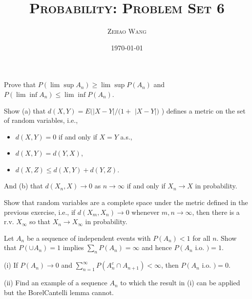 \documentclass[en, normal, 11pt, black]{elegantnote}
\title{\textsc{Probability: Problem Set 6}}
\author{\textsc{Zehao Wang}}
\date{\today}
\newenvironment{exercise}[1]{\begin{tcolorbox}[colback=black!15, colframe=black!80, breakable, title=#1]}{\end{tcolorbox}}
\begin{document}
    \maketitle
    \begin{exercise}{2.3.1}
        Prove that $P(\lim \sup A_n) \geqslant \lim \sup P(A_n)$ and $P(\lim \inf A_n) \leqslant \lim \inf P(A_n)$. 
    \end{exercise}

    \begin{exercise}{2.3.6. Metric for convergence in probability. }
        Show (a) that $d(X, Y)=E(|X-Y| /(1+$ $|X-Y|)$ ) defines a metric on the set of random variables, i.e., 
        \begin{itemize}
            \item[(i)] $d(X, Y)=0$ if and only if $X=Y$ a.s., 
            \item[(ii)] $d(X, Y)=d(Y, X)$, 
            \item[(iii)] $d(X, Z) \leq d(X, Y)+d(Y, Z)$. 
        \end{itemize}
        And (b) that $d\left(X_{n}, X\right) \rightarrow 0$ as $n \rightarrow \infty$ if and only if $X_{n} \rightarrow X$ in probability. 
    \end{exercise}

    \begin{exercise}{2.3.7}
        Show that random variables are a complete space under the metric defined in the previous exercise, i.e., if $d\left(X_{m}, X_{n}\right) \rightarrow 0$ whenever $m, n \rightarrow \infty$, then there is a r.v. $X_{\infty}$ so that $X_{n} \rightarrow X_{\infty}$ in probability. 
    \end{exercise}

    \begin{exercise}{2.3.8}
        Let $A_{n}$ be a sequence of independent events with $P\left(A_{n}\right)<1$ for all $n$. Show that $P\left(\cup A_{n}\right)=1$ implies $\sum_{n} P\left(A_{n}\right)=\infty$ and hence $P\left(A_{n}\right.$ i.o. $)=1$. 
    \end{exercise}

    \begin{exercise}{2.3.9}
        (i) If $P\left(A_{n}\right) \rightarrow 0$ and $\sum_{n=1}^{\infty} P\left(A_{n}^{c} \cap A_{n+1}\right)<\infty$, then $P\left(A_{n}\right.$ i.o. $)=0$. 
        
        (ii) Find an example of a sequence $A_{n}$ to which the result in (i) can be applied but the BorelCantelli lemma cannot. 
    \end{exercise}
    
\end{document}
